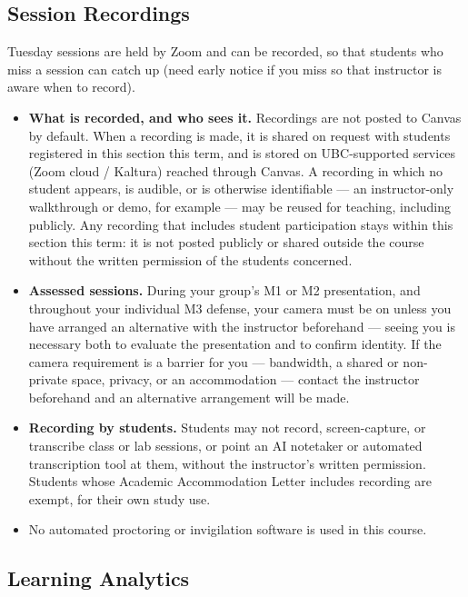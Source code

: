 \documentclass[
]{article}
\providecommand{\tightlist}{%
  \setlength{\itemsep}{0pt}\setlength{\parskip}{0pt}}
\begin{document}
\subsection{Session Recordings}\label{session-recordings}

Tuesday sessions are held by Zoom and can be recorded, so that students
who miss a session can catch up (need early notice if you miss so that
instructor is aware when to record).

\begin{itemize}
\tightlist
\item
  \textbf{What is recorded, and who sees it.} Recordings are not posted
  to Canvas by default. When a recording is made, it is shared on
  request with students registered in this section this term, and is
  stored on UBC-supported services (Zoom cloud / Kaltura) reached
  through Canvas. A recording in which no student appears, is audible,
  or is otherwise identifiable --- an instructor-only walkthrough or
  demo, for example --- may be reused for teaching, including publicly.
  Any recording that includes student participation stays within this
  section this term: it is not posted publicly or shared outside the
  course without the written permission of the students concerned.
\item
  \textbf{Assessed sessions.} During your group's M1 or M2 presentation,
  and throughout your individual M3 defense, your camera must be on
  unless you have arranged an alternative with the instructor beforehand
  --- seeing you is necessary both to evaluate the presentation and to
  confirm identity. If the camera requirement is a barrier for you ---
  bandwidth, a shared or non-private space, privacy, or an accommodation
  --- contact the instructor beforehand and an alternative arrangement
  will be made.
\item
  \textbf{Recording by students.} Students may not record,
  screen-capture, or transcribe class or lab sessions, or point an AI
  notetaker or automated transcription tool at them, without the
  instructor's written permission. Students whose Academic Accommodation
  Letter includes recording are exempt, for their own study use.
\item
  No automated proctoring or invigilation software is used in this
  course.
\end{itemize}

\subsection{Learning Analytics}\label{learning-analytics}
\end{document}
